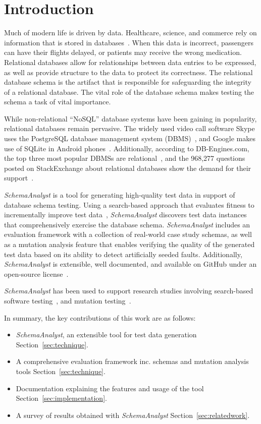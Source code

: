 \section{Introduction}\label{sec:intro}

Much of modern life is driven by data.  Healthcare, science, and commerce rely on information that is
stored in databases~\cite{kapfhammer2007comprehensive}.  When this data is incorrect, passengers can have
their flights delayed, or patients may receive the wrong medication. 
Relational databases allow for relationships between data entries to be expressed, as well as provide structure to 
the data to protect its correctness. The relational database schema is the artifact
that is responsible for safeguarding the integrity of a relational database. The vital role of the database
schema makes testing the schema a task of vital importance.

While non-relational ``NoSQL'' database systems have been gaining in popularity, relational databases remain
pervasive. The widely used video call software Skype uses the PostgreSQL database management system
(DBMS)~\cite{postgres},
and Google makes use of SQLite in Android phones~\cite{sqlite}.
Additionally, according to DB-Engines.com, the top three most popular DBMSs are 
relational~\cite{dbrank}, and the 968,277 questions posted on StackExchange 
about relational databases show the demand for their support~\cite{stackexchange}.

\textit{SchemaAnalyst} is a tool for generating high-quality test data in support of database schema
testing. Using a search-based approach that evaluates fitness to incrementally improve test data~\cite{Korel:AVM},
\textit{SchemaAnalyst} discovers test data instances that comprehensively exercise the database schema.
\textit{SchemaAnalyst} includes an evaluation framework
with a collection of real-world case study schemas, as well as a mutation analysis feature
that enables verifying the quality of the generated test data based on its ability to detect artificially
seeded faults. Additionally, \textit{SchemaAnalyst}
is extensible, well documented, and available on GitHub under an open-source license~\cite{tool}.

\textit{SchemaAnalyst} has been used to support research studies involving search-based
software testing~\cite{kapfhammer2013search,mcminn2015effectiveness,kinneer2015automatically}, and
mutation testing~\cite{wright2013efficient,wright2014impact,wright2015mutation}.

In summary, the key contributions of this work are as follows:

\begin{itemize}
\item \textit{SchemaAnalyst}, an extensible tool for test data generation Section~\ref{sec:technique}.
\item A comprehensive evaluation framework inc. schemas and mutation analysis tools Section~\ref{sec:technique}.
\item Documentation explaining the features and usage of the tool Section~\ref{sec:implementation}.
\item A survey of results obtained with \textit{SchemaAnalyst} Section~\ref{sec:relatedwork}.
\end{itemize}
